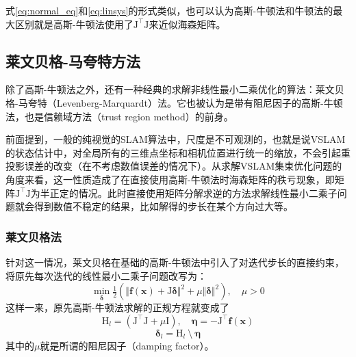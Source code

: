 式\eqref{eq:normal_eq}和\eqref{eq:linsys}的形式类似，也可以认为高斯-牛顿法和牛顿法的最大区别就是高斯-牛顿法使用了$\mathrm{J}^\top\mathrm{J}$来近似海森矩阵。

\subsection{莱文贝格-马夸特方法}

除了高斯-牛顿法之外，还有一种经典的求解非线性最小二乘优化的算法：莱文贝格-马夸特（Levenberg-Marquardt）法。它也被认为是带有阻尼因子的高斯-牛顿法，也是信赖域方法（trust region method）的前身\citep{jorge2006numerical}。

前面提到，一般的纯视觉的SLAM算法中，尺度是不可观测的，也就是说VSLAM的状态估计中，对全局所有的三维点坐标和相机位置进行统一的缩放，不会引起重投影误差的改变（在不考虑数值误差的情况下）。从求解VSLAM集束优化问题的角度来看，这一性质造成了在直接使用高斯-牛顿法时海森矩阵的秩亏现象，即矩阵$\mathrm{J}^\top\mathrm{J}$为半正定的情况。此时直接使用矩阵分解求逆的方法求解线性最小二乘子问题就会得到数值不稳定的结果，比如解得的步长在某个方向过大等。

\subsubsection{莱文贝格法}

针对这一情况，莱文贝格在基础的高斯-牛顿法中引入了对迭代步长的直接约束，将原先每次迭代的线性最小二乘子问题改写为：
\begin{equation}
    \mathop{\min}_{\bm{\delta}} \tfrac{1}{2}
    \left(
        \Vert \bm{f}(\bm{x}) + \mathrm{J}\bm{\delta} \Vert^2 +
        \mu \Vert \bm{\delta} \Vert^2
    \right), \quad \mu > 0
\end{equation}
这样一来，原先高斯-牛顿法求解的正规方程就变成了
\begin{equation}
    \mathrm{H}_{l} = \left( \mathrm{J}^\top\mathrm{J}+\mu\mathrm{I} \right), \quad
    \bm{\eta}      = -\mathrm{J}^\top\bm{f}(\bm{x})
\end{equation}
\begin{equation}
    \bm{\delta}_{l} = \mathrm{H}_{l} \:\setminus\: \bm{\eta}
    \label{eq:levenberg}
\end{equation}
其中的$\mu$就是所谓的阻尼因子（damping factor）。


